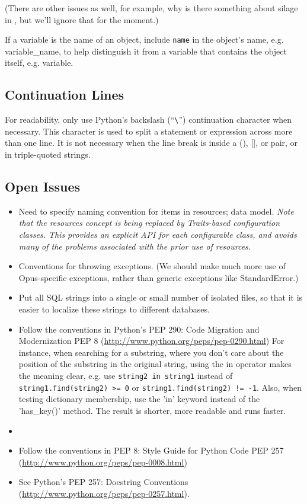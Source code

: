 (There are other issues as well, for example, why is there something about
silage in , but we'll ignore that for the moment.)

If a variable is the name of an object, include \verb|name| in the object's
name, e.g. variable_name, to help distinguish it from a variable that contains
the object itself, e.g. variable.

\subsection{Continuation Lines}

For readability, only use Python's backslash (``\verb|\|'') continuation
character when necessary.  This character is used to split a statement or
expression across more than one line.  It is not necessary when the line
break is inside a (), [], or {} pair, or in triple-quoted strings.

\subsection{Open Issues}

\begin{itemize}

\item Need to specify naming convention for items in resources; data model.
\emph{Note that the resources concept is being replaced by
Traits-based configuration classes.  This provides an explicit API
for each configurable class, and avoids many of the problems
associated with the prior use of resources.}

\item Conventions for throwing exceptions.  (We should make much more use of
Opus-specific exceptions, rather than generic exceptions like StandardError.)

\item Put all SQL strings into a single or small number of
isolated files, so that it is easier to localize these strings to different
databases.

\item Follow the conventions in Python's \pythonindex PEP 290: Code
Migration and Modernization PEP 8
(\url{http://www.python.org/peps/pep-0290.html}) For instance, when
searching for a substring, where you don't care about the position of the
substring in the original string, using the in operator makes the meaning
clear, e.g. use \verb|string2 in string1| instead of
\verb|string1.find(string2) >= 0| or \verb|string1.find(string2) != -1|.  Also,
when testing dictionary membership, use the 'in' keyword instead of the
'has_key()' method. The result is shorter, more readable and runs faster.\item

\item Follow the conventions in PEP 8: Style Guide for Python \pythonindex Code
PEP 257 (\url{http://www.python.org/peps/pep-0008.html})

\item See Python's \pythonindex PEP 257: Docstring Conventions
(\url{http://www.python.org/peps/pep-0257.html}).

\end{itemize}


